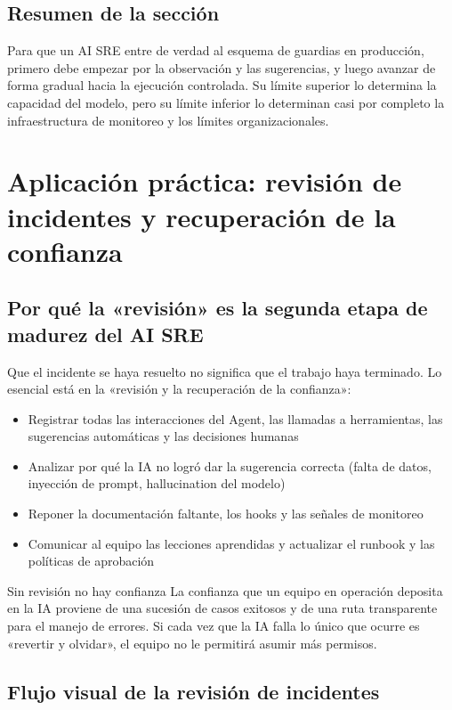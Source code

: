 \documentclass[a4paper]{article}
\begin{document}
\subsection{Resumen de la sección}

Para que un AI SRE entre de verdad al esquema de guardias en producción, primero debe empezar por la observación y las sugerencias, y luego avanzar de forma gradual hacia la ejecución controlada. Su límite superior lo determina la capacidad del modelo, pero su límite inferior lo determinan casi por completo la infraestructura de monitoreo y los límites organizacionales.
\section{Aplicación práctica: revisión de incidentes y recuperación de la confianza}

\subsection{Por qué la «revisión» es la segunda etapa de madurez del AI SRE}

Que el incidente se haya resuelto no significa que el trabajo haya terminado. Lo esencial está en la «revisión y la recuperación de la confianza»:

\begin{itemize}
    \item Registrar todas las interacciones del Agent, las llamadas a herramientas, las sugerencias automáticas y las decisiones humanas
    \item Analizar por qué la IA no logró dar la sugerencia correcta (falta de datos, inyección de prompt, hallucination del modelo)
    \item Reponer la documentación faltante, los hooks y las señales de monitoreo
    \item Comunicar al equipo las lecciones aprendidas y actualizar el runbook y las políticas de aprobación
\end{itemize}

\begin{warningbox}{Sin revisión no hay confianza}
La confianza que un equipo en operación deposita en la IA proviene de una sucesión de casos exitosos y de una ruta transparente para el manejo de errores. Si cada vez que la IA falla lo único que ocurre es «revertir y olvidar», el equipo no le permitirá asumir más permisos.
\end{warningbox}

\subsection{Flujo visual de la revisión de incidentes}
\end{document}
